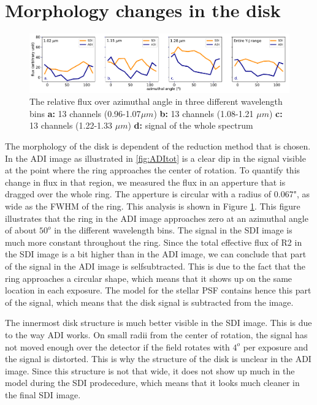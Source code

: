 \documentclass[twoside,single]{lion-msc}
\begin{document}
\section{Morphology changes in the disk}
\begin{figure}[htb]
\centering
\includegraphics[trim={0cm 0cm 0cm 0cm},clip,width = \textwidth]{coloroverangle}
\caption{The relative flux over azimuthal angle in three different wavelength bins \textbf{a:} 13 channels (0.96-1.07$\mu m$) \textbf{b:} 13 channels (1.08-1.21 $\mu m$) \textbf{c:} 13 channels (1.22-1.33 $\mu m$) \textbf{d:} signal of the whole spectrum}
\label{fig:coloroverangle}
\end{figure}

The morphology of the disk is dependent of the reduction method that is chosen. In the ADI image as illustrated in \ref{fig:ADItot} is a clear dip in the signal visible at the point where the ring approaches the center of rotation. To quantify this change in flux in that region, we measured the flux in an apperture that is dragged over the whole ring. The apperture is circular with a radius of 0.067", as wide as the FWHM of the ring. This analysis is shown in Figure \ref{fig:coloroverangle}. This figure illustrates that the ring in the ADI image approaches zero at an azimuthal angle of about $50^o$ in the different wavelength bins. The signal in the SDI image is much more constant throughout the ring. Since the total effective flux of R2 in the SDI image is a bit higher than in the ADI image, we can conclude that part of the signal in the ADI image is selfsubtracted. This is due to the fact that the ring approaches a circular shape, which means that it shows up on the same location in each exposure. The model for the stellar PSF contains hence this part of the signal, which means that the disk signal is subtracted from the image.
\bigskip

The innermost disk structure is much better visible in the SDI image. This is due to the way ADI works. On small radii from the center of rotation, the signal has not moved enough over the detector if the field rotates with $4^o$ per exposure and the signal is distorted. This is why the structure of the disk is unclear in the ADI image. Since this structure is not that wide, it does not show up much in the model during the SDI prodecedure, which means that it looks much cleaner in the final SDI image.
\bigskip
\end{document}

